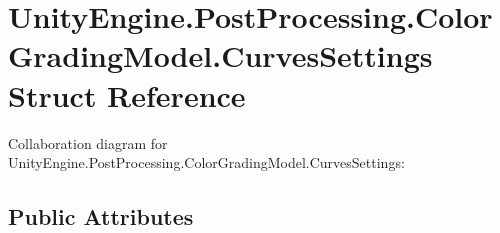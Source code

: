 \hypertarget{struct_unity_engine_1_1_post_processing_1_1_color_grading_model_1_1_curves_settings}{}\section{Unity\+Engine.\+Post\+Processing.\+Color\+Grading\+Model.\+Curves\+Settings Struct Reference}
\label{struct_unity_engine_1_1_post_processing_1_1_color_grading_model_1_1_curves_settings}


Collaboration diagram for Unity\+Engine.\+Post\+Processing.\+Color\+Grading\+Model.\+Curves\+Settings\+:
\subsection*{Public Attributes}
